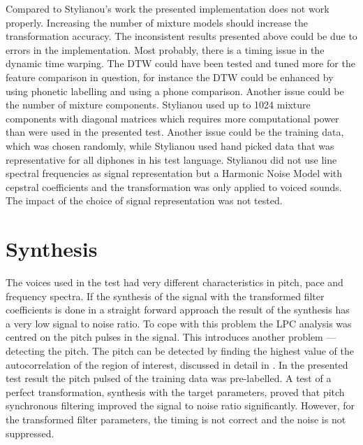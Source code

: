 Compared to Stylianou's work \cite{stylianou98} the presented implementation does not work properly. Increasing the number of mixture models should increase the transformation accuracy. The inconsistent results presented above could be due to errors in the implementation. Most probably, there is a timing issue in the dynamic time warping. The DTW could have been tested and tuned more for the feature comparison in question, for instance the DTW could be enhanced by using phonetic labelling and using a phone comparison. Another issue could be the number of mixture components. Stylianou used up to 1024 mixture components with diagonal matrices which requires more computational power than were used in the presented test. Another issue could be the training data, which was chosen randomly, while Stylianou used hand picked data that was representative for all diphones in his test language. Stylianou did not use line spectral frequencies as signal representation but a Harmonic Noise Model with cepstral coefficients and the transformation was only applied to voiced sounds. The impact of the choice of signal representation was not tested.

\section{Synthesis} %
\label{sec:synthesis}
The voices used in the test had very different characteristics in pitch, pace and frequency spectra. If the synthesis of the signal with the transformed filter coefficients is done in a straight forward approach the result of the synthesis has a very low signal to noise ratio. To cope with this problem the LPC analysis was centred on the pitch pulses in the signal. This introduces another problem --- detecting the pitch. The pitch can be detected by finding the highest value of the autocorrelation of the region of interest, discussed in detail in \cite[p. 324]{taletek}. In the presented test result the pitch pulsed of the training data was pre-labelled. A test of a perfect transformation, \ie synthesis with the target parameters, proved that pitch synchronous filtering improved the signal to noise ratio significantly. However, for the transformed filter parameters, the timing is not correct and the noise is not suppressed.

